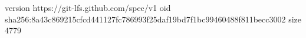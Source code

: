version https://git-lfs.github.com/spec/v1
oid sha256:8a43c869215cfcd441127fc786993f25daf19bd7f1bc99460488f811becc3002
size 4779
